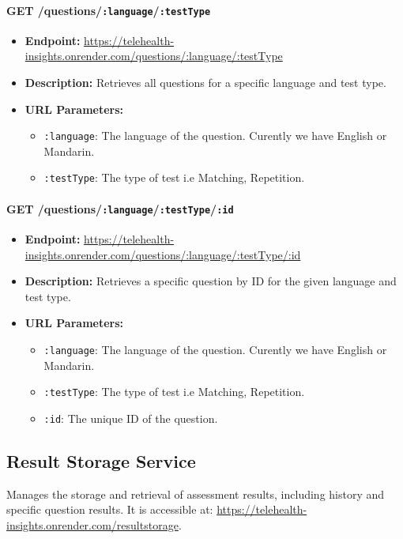 \documentclass{article}
\begin{document}
  \paragraph{GET /questions/\texttt{:language}/\texttt{:testType}}
  \begin{itemize}
      \item \textbf{Endpoint:} 
          \url{https://telehealth-insights.onrender.com/questions/:language/:testType}
      \item \textbf{Description:} Retrieves all questions for a specific 
            language and test type.
      \item \textbf{URL Parameters:}
      \begin{itemize}
          \item \texttt{:language}: The language of the question. Curently we have English or Mandarin.
          \item \texttt{:testType}: The type of test i.e Matching, Repetition.
      \end{itemize}
  \end{itemize}
  
  \paragraph{GET /questions/\texttt{:language}/\texttt{:testType}/\texttt{:id}}
  \begin{itemize}
      \item \textbf{Endpoint:} 
          \url{https://telehealth-insights.onrender.com/questions/:language/:testType/:id}
      \item \textbf{Description:} Retrieves a specific question by ID for the 
            given language and test type.
      \item \textbf{URL Parameters:}
      \begin{itemize}
          \item \texttt{:language}: The language of the question. Curently we have English or Mandarin.
          \item \texttt{:testType}: The type of test i.e Matching, Repetition.
          \item \texttt{:id}: The unique ID of the question.
      \end{itemize}
  \end{itemize}
  
  \subsection{Result Storage Service}
  Manages the storage and retrieval of assessment results, including history 
  and specific question results. It is accessible at: 
  \url{https://telehealth-insights.onrender.com/resultstorage}.
  
\end{document}
